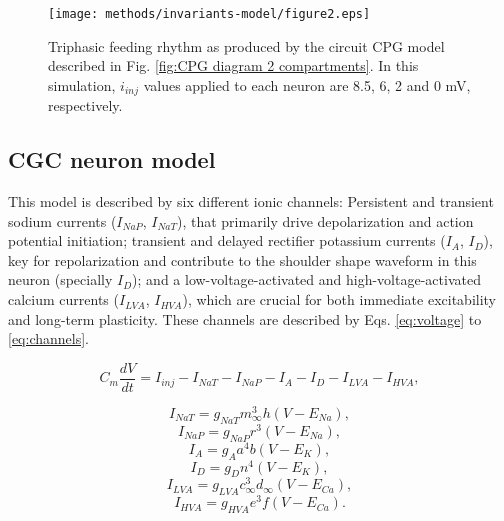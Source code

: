 \begin{figure}[htb!]
	\centering
	\texttt{[image: methods/invariants-model/figure2.eps]}
	\caption{Triphasic feeding rhythm as produced by the circuit CPG model described in Fig. \ref{fig:CPG diagram 2 compartments}. In this simulation, $i_{inj}$ values applied to each neuron are 8.5, 6, 2 and 0 mV, respectively.}
	\label{fig:model simulation}
\end{figure}



\subsection{CGC neuron model}
\label{subsec:cgc neuron model equations}
This model is described by six different ionic channels: Persistent and transient sodium currents ($I_{NaP}$, $I_{NaT}$), that primarily drive depolarization and action potential initiation; transient and delayed rectifier potassium currents ($I_A$, $I_D$), key for repolarization and contribute to the shoulder shape waveform in this neuron (specially $I_D$); and a low-voltage-activated and high-voltage-activated calcium currents ($I_{LVA}$, $I_{HVA}$), which are crucial for both immediate excitability and long-term plasticity. These channels are described by Eqs. \ref{eq:voltage} to \ref{eq:channels}. 

\begin{equation}
C_m\frac{dV}{dt} = I_{inj} - I_{NaT} - I_{NaP} - I_{A} - I_{D} - I_{LVA} - I_{HVA},
\label{eq:voltage}
\end{equation}

\begin{equation}
I_{NaT} = g_{NaT} m_{{\infty}}^3 h (V - E_{Na}),
\end{equation}
\begin{equation}
I_{NaP} = g_{NaP} r^3 (V - E_{Na}),
\end{equation}
\begin{equation}
I_{A} = g_{A} a^4 b (V - E_{K}),
\end{equation}
\begin{equation}
I_{D} = g_{D} n^4 (V - E_{K}),
\end{equation}
\begin{equation}
I_{LVA} = g_{LVA} c_{{\infty}}^3 d_{{\infty}} (V - E_{Ca}),
\end{equation}
\begin{equation}
I_{HVA} = g_{HVA} e^3 f (V - E_{Ca}).
\label{eq:channels}
\end{equation}

